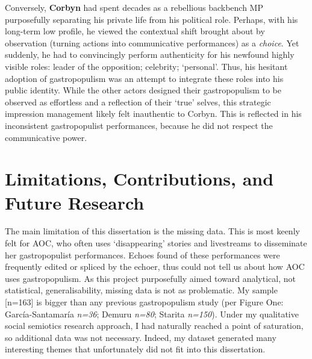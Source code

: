 \documentclass[a4paper, nobind]{templates/ociamthesis}
\begin{document}
Conversely, \textbf{Corbyn} had spent decades as a rebellious backbench MP purposefully separating his private life from his political role. Perhaps, with his long-term low profile, he viewed the contextual shift brought about by observation (turning actions into communicative performances) as a \emph{choice}. Yet suddenly, he had to convincingly perform authenticity for his newfound highly visible roles: leader of the opposition; celebrity; `personal'. Thus, his hesitant adoption of gastropopulism was an attempt to integrate these roles into his public identity. While the other actors designed their gastropopulism to be observed as effortless and a reflection of their `true' selves, this strategic impression management likely felt inauthentic to Corbyn. This is reflected in his inconsistent gastropopulist performances, because he did not respect the communicative power.

\hypertarget{limitations-contributions-and-future-research}{%
\section*{Limitations, Contributions, and Future Research}\label{limitations-contributions-and-future-research}}

The main limitation of this dissertation is the missing data. This is most keenly felt for AOC, who often uses `disappearing' stories and livestreams to disseminate her gastropopulist performances. Echoes found of these performances were frequently edited or spliced by the echoer, thus could not tell us about how AOC uses gastropopulism. As this project purposefully aimed toward analytical, not statistical, generalisability, missing data is not as problematic. My sample {[}n=163{]} is bigger than any previous gastropopulism study (per Figure One: García-Santamaría \emph{n=36}; Demuru \emph{n=80}; Starita \emph{n=150}). Under my qualitative social semiotics research approach, I had naturally reached a point of saturation, so additional data was not necessary. Indeed, my dataset generated many interesting themes that unfortunately did not fit into this dissertation.
\end{document}
